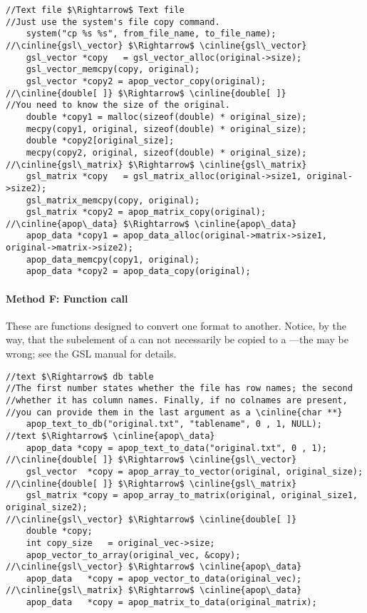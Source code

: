  
  
\lstset{texcl=true} %
\begin{lstlisting}
//Text file $\Rightarrow$ Text file
//Just use the system's file copy command.
    system("cp %s %s", from_file_name, to_file_name);
//\cinline{gsl\_vector} $\Rightarrow$ \cinline{gsl\_vector}
    gsl_vector *copy   = gsl_vector_alloc(original->size);
    gsl_vector_memcpy(copy, original);
    gsl_vector *copy2 = apop_vector_copy(original);
//\cinline{double[ ]} $\Rightarrow$ \cinline{double[ ]}
//You need to know the size of the original.
    double *copy1 = malloc(sizeof(double) * original_size);
    mecpy(copy1, original, sizeof(double) * original_size);
    double *copy2[original_size];
    mecpy(copy2, original, sizeof(double) * original_size);
//\cinline{gsl\_matrix} $\Rightarrow$ \cinline{gsl\_matrix}
    gsl_matrix *copy   = gsl_matrix_alloc(original->size1, original->size2);
    gsl_matrix_memcpy(copy, original);
    gsl_matrix *copy2 = apop_matrix_copy(original);
//\cinline{apop\_data} $\Rightarrow$ \cinline{apop\_data}
    apop_data *copy1 = apop_data_alloc(original->matrix->size1, original->matrix->size2);
    apop_data_memcpy(copy1, original);
    apop_data *copy2 = apop_data_copy(original);
\end{lstlisting}

\paragraph{Method F: Function call}
 
 
These are functions designed to convert one format to another.
Notice, by the way, that the  subelement of a
 can not necessarily be copied to a
---the  may be wrong; see the GSL manual
for details.
\begin{lstlisting}
//text $\Rightarrow$ db table
//The first number states whether the file has row names; the second
//whether it has column names. Finally, if no colnames are present,
//you can provide them in the last argument as a \cinline{char **}
    apop_text_to_db("original.txt", "tablename", 0 , 1, NULL);
//text $\Rightarrow$ \cinline{apop\_data}
    apop_data *copy = apop_text_to_data("original.txt", 0 , 1);
//\cinline{double[ ]} $\Rightarrow$ \cinline{gsl\_vector}
    gsl_vector  *copy = apop_array_to_vector(original, original_size);
//\cinline{double[ ]} $\Rightarrow$ \cinline{gsl\_matrix}
    gsl_matrix *copy = apop_array_to_matrix(original, original_size1, original_size2);
//\cinline{gsl\_vector} $\Rightarrow$ \cinline{double[ ]}
    double *copy;
    int copy_size   = original_vec->size;
    apop_vector_to_array(original_vec, &copy);
//\cinline{gsl\_vector} $\Rightarrow$ \cinline{apop\_data}
    apop_data   *copy = apop_vector_to_data(original_vec);
//\cinline{gsl\_matrix} $\Rightarrow$ \cinline{apop\_data}
    apop_data   *copy = apop_matrix_to_data(original_matrix);
\end{lstlisting}

